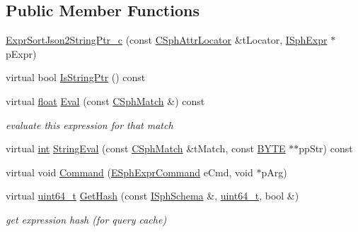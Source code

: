 \subsection*{Public Member Functions}
\begin{DoxyCompactItemize}
\item 
\hyperlink{structExprSortJson2StringPtr__c_ad50e0518e679d596fd02973e79c8e1d4}{Expr\-Sort\-Json2\-String\-Ptr\-\_\-c} (const \hyperlink{structCSphAttrLocator}{C\-Sph\-Attr\-Locator} \&t\-Locator, \hyperlink{structISphExpr}{I\-Sph\-Expr} $\ast$p\-Expr)
\item 
virtual bool \hyperlink{structExprSortJson2StringPtr__c_aeca125363fd98b2f2bce71de76d6fec4}{Is\-String\-Ptr} () const 
\item 
virtual \hyperlink{sphinxexpr_8cpp_a0e0d0739f7035f18f949c2db2c6759ec}{float} \hyperlink{structExprSortJson2StringPtr__c_ac9fa8840835fa2888295913f0099d617}{Eval} (const \hyperlink{classCSphMatch}{C\-Sph\-Match} \&) const 
\begin{DoxyCompactList}\small\item\em evaluate this expression for that match \end{DoxyCompactList}\item 
virtual \hyperlink{sphinxexpr_8cpp_a4a26e8f9cb8b736e0c4cbf4d16de985e}{int} \hyperlink{structExprSortJson2StringPtr__c_aa0c0ee6ee3edc4218f7f744a79d5363d}{String\-Eval} (const \hyperlink{classCSphMatch}{C\-Sph\-Match} \&t\-Match, const \hyperlink{sphinxstd_8h_a4ae1dab0fb4b072a66584546209e7d58}{B\-Y\-T\-E} $\ast$$\ast$pp\-Str) const 
\item 
virtual void \hyperlink{structExprSortJson2StringPtr__c_ab7bdc15f1d2b4b5e149a6dc00432e5e5}{Command} (\hyperlink{sphinxexpr_8h_a30be184fb07bd80c271360fc6094c818}{E\-Sph\-Expr\-Command} e\-Cmd, void $\ast$p\-Arg)
\item 
virtual \hyperlink{sphinxstd_8h_aaa5d1cd013383c889537491c3cfd9aad}{uint64\-\_\-t} \hyperlink{structExprSortJson2StringPtr__c_a6eff442f086b61369a445fa54ca85d49}{Get\-Hash} (const \hyperlink{classISphSchema}{I\-Sph\-Schema} \&, \hyperlink{sphinxstd_8h_aaa5d1cd013383c889537491c3cfd9aad}{uint64\-\_\-t}, bool \&)
\begin{DoxyCompactList}\small\item\em get expression hash (for query cache) \end{DoxyCompactList}\end{DoxyCompactItemize}
